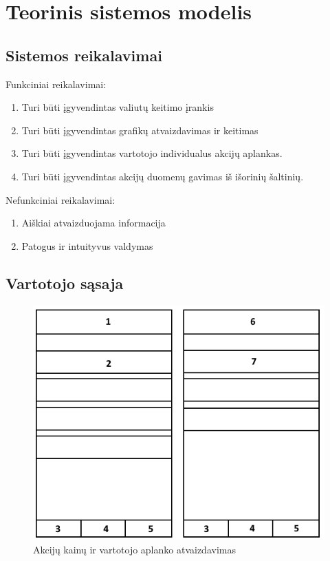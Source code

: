 \documentclass[a4paper,12pt,fleqn]{article}
\begin{document}
\newpage
\section{Teorinis sistemos modelis}
\subsection{Sistemos reikalavimai}
Funkciniai reikalavimai:
\begin{enumerate}[leftmargin=2cm]
	\item Turi būti įgyvendintas valiutų keitimo įrankis
	\item Turi būti įgyvendintas grafikų atvaizdavimas ir keitimas
	\item Turi būti įgyvendintas vartotojo individualus akcijų aplankas.
	\item Turi būti įgyvendintas akcijų duomenų gavimas iš išorinių šaltinių.
\end{enumerate}

Nefunkciniai reikalavimai:
\begin{enumerate}[leftmargin=2cm]
	\item Aiškiai atvaizduojama informacija
	\item Patogus ir intuityvus valdymas
\end{enumerate}

\subsection{Vartotojo sąsaja}
\begin{figure}[h]
	\centering
	\includegraphics[width=0.55\linewidth]{vartotojo-sasaja.png}
	\caption{Akcijų kainų ir vartotojo aplanko atvaizdavimas}
	\label{fig:sas1}
\end{figure}
\end{document}

